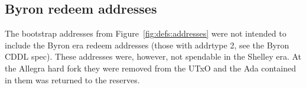 \subsection{Byron redeem addresses}
\label{sec:errata:byron-redeem-addresses}

The bootstrap addresses from Figure~\ref{fig:defs:addresses} were not intended
to include the Byron era redeem addresses
(those with addrtype 2, see the Byron CDDL spec).
These addresses were, however, not spendable in the Shelley era.
At the Allegra hard fork they were removed from the UTxO
and the Ada contained in them was returned to the reserves.
